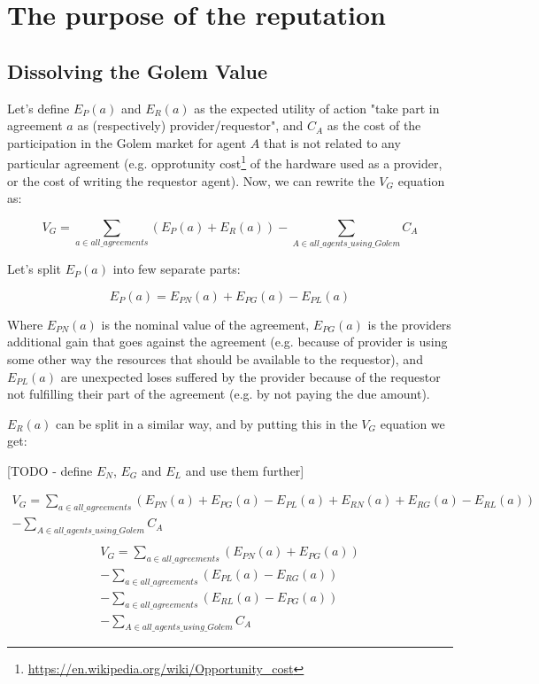 \documentclass{article}
\begin{document}
\section{The purpose of the reputation}
\subsection{Dissolving the Golem Value}

Let's define $E_P(a)$ and $E_R(a)$ as the expected utility of action "take part in agreement $a$ as (respectively) provider/requestor", and $C_A$ as the cost of
the participation in the Golem market for agent $A$ that is not related to any particular agreement 
(e.g. opprotunity cost\footnote{\href{https://en.wikipedia.org/wiki/Opportunity\_cost}{https://en.wikipedia.org/wiki/Opportunity\_cost}} of the hardware used as a provider, 
or the cost of writing the requestor agent). Now, we can rewrite the $V_G$ equation as:

\begin{equation}
    V_G = \sum_{a \in all\_agreements}(E_P(a) + E_R(a)) - \sum_{A \in all\_agents\_using\_Golem}C_A
\end{equation}

Let's split $E_P(a)$ into few separate parts:

\begin{equation}
    E_P(a) = E_{PN}(a) + E_{PG}(a) - E_{PL}(a)
\end{equation}

Where $E_{PN}(a)$ is the nominal value of the agreement, $E_{PG}(a)$ is the providers additional gain that goes against the agreement 
(e.g. because of provider is using some other way the resources that should be available to the requestor), and $E_{PL}(a)$ are unexpected loses 
suffered by the provider because of the requestor not fulfilling their part of the agreement (e.g. by not paying the due amount).

$E_R(a)$ can be split in a similar way, and by putting this in the $V_G$ equation we get:

[TODO - define $E_N$, $E_G$ and $E_L$ and use them further]

\begin{equation}
\begin{split}
    V_G = \sum_{a \in all\_agreements}(E_{PN}(a) + E_{PG}(a) - E_{PL}(a) + E_{RN}(a) + E_{RG}(a) - E_{RL}(a)) \\
            - \sum_{A \in all\_agents\_using\_Golem}C_A \\
\end{split}
\end{equation}
\begin{equation}
\begin{split}
    V_G = \sum_{a \in all\_agreements}(E_{PN}(a) + E_{PG}(a)) \\
          - \sum_{a \in all\_agreements}(E_{PL}(a)- E_{RG}(a)) \\
          - \sum_{a \in all\_agreements}(E_{RL}(a)- E_{PG}(a)) \\
          - \sum_{A \in all\_agents\_using\_Golem}C_A
\end{split}
\end{equation}
\end{document}
